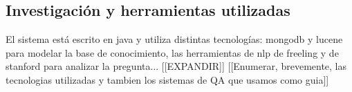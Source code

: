 






\bigskip

\subsection{Investigaci\'on y herramientas utilizadas}

El sistema est\'a escrito en java y utiliza distintas tecnolog\'ias:
mongodb y lucene para modelar la base de conocimiento, las herramientas
de nlp de freeling y de stanford para analizar la pregunta...
[[EXPANDIR]]
[[Enumerar, brevemente, las tecnologias utilizadas y tambien los sistemas de QA que usamos como guia]]

\bigskip
